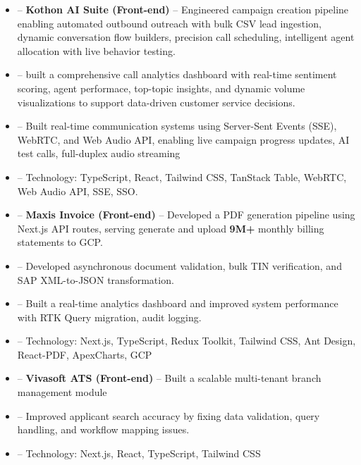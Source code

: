 \documentclass[letterpaper,11pt]{article}
\newcommand{\resumeItem}[1]{
  \item\small{
    {#1 \vspace{-2pt}}
  }
}
\newcommand{\resumeItemListStart}{\begin{itemize}[leftmargin=0.05in, label={}]}
\newcommand{\resumeItemListEnd}{\end{itemize}\vspace{-5pt}}
\begin{document}

      \resumeItemListStart
        \resumeItem{-- \textbf{Kothon AI Suite (Front-end)} -- Engineered campaign creation pipeline enabling automated outbound outreach with bulk CSV lead ingestion, dynamic conversation flow builders, precision call scheduling, intelligent agent allocation with live behavior testing.}
        \resumeItem{-- built a comprehensive call analytics dashboard with real-time sentiment scoring, agent performace, top-topic insights, and dynamic volume visualizations to support data-driven customer service decisions.}
        \resumeItem{-- Built real-time communication systems using Server-Sent Events (SSE), WebRTC, and Web Audio API, enabling live campaign progress updates, AI test calls, full-duplex audio streaming}
        \resumeItem{-- Technology: TypeScript, React, Tailwind CSS, TanStack Table, WebRTC, Web Audio API, SSE, SSO.}
    \resumeItemListEnd
      
      \resumeItemListStart
        \resumeItem{-- \textbf{Maxis Invoice (Front-end)} -- Developed a PDF generation pipeline using Next.js API routes, serving generate and upload \textbf{9M+} monthly billing statements to GCP.}
        \resumeItem{-- Developed asynchronous document validation, bulk TIN verification, and SAP XML-to-JSON transformation.}
        \resumeItem{-- Built a real-time analytics dashboard and improved system performance with RTK Query migration, audit logging.}
        \resumeItem{-- Technology: Next.js, TypeScript, Redux Toolkit, Tailwind CSS, Ant Design, React-PDF, ApexCharts, GCP}
      \resumeItemListEnd

      \resumeItemListStart
        \resumeItem{-- \textbf{Vivasoft ATS (Front-end)} -- Built a scalable multi-tenant branch management module}
        \resumeItem{-- Improved applicant search accuracy by fixing data validation, query handling, and workflow mapping issues.}
        \resumeItem{-- Technology: Next.js, React, TypeScript, Tailwind CSS}
      \resumeItemListEnd
\end{document}
